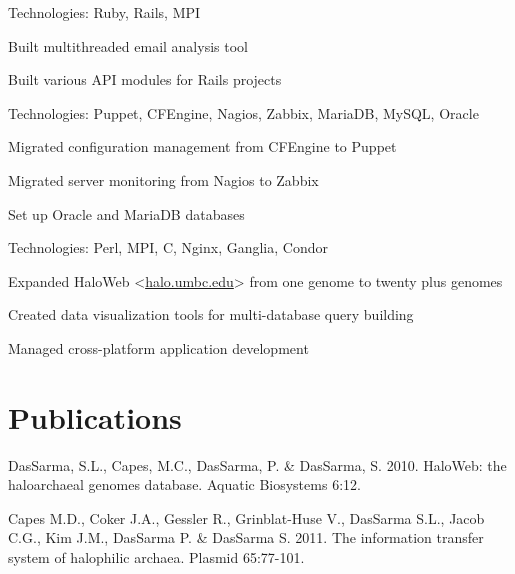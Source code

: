 \documentclass[letterpaper]{resume}
\begin{document}
\begin{compactitem}
\item Technologies: Ruby, Rails, MPI
\item Built multithreaded email analysis tool
\item Built various API modules for Rails projects
\end{compactitem}

\begin{compactitem}
\item Technologies: Puppet, CFEngine, Nagios, Zabbix, MariaDB, MySQL, Oracle
\item Migrated configuration management from CFEngine to Puppet
\item Migrated server monitoring from Nagios to Zabbix
\item Set up Oracle and MariaDB databases
\end{compactitem}

\begin{compactitem}
\item Technologies: Perl, MPI, C, Nginx, Ganglia, Condor
\item Expanded HaloWeb <\href{https://halo.umbc.edu}{halo.umbc.edu}> from one genome to twenty plus genomes
\item Created data visualization tools for multi-database query building
\item Managed cross-platform application development
\end{compactitem}

\section{Publications}

\begin{compactitem}
\item DasSarma, S.L., Capes, M.C., DasSarma, P. \& DasSarma, S. 2010. HaloWeb: the haloarchaeal genomes database. Aquatic Biosystems 6:12.
\item Capes M.D., Coker J.A., Gessler R., Grinblat-Huse V., DasSarma S.L., Jacob C.G., Kim J.M., DasSarma P. \& DasSarma S. 2011. The information transfer system of halophilic archaea. Plasmid 65:77-101.
\end{compactitem}
\end{document}
